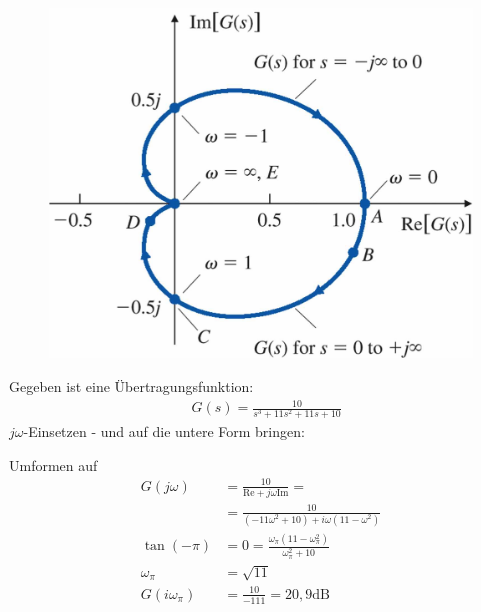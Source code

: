 \begin{tcolorbox}[colback=white!10!white,
                  colframe=blue!50!white,
                  title=Konstruktionsregeln Nyquist-Diagramm]
\begin{figure}[H]
\begin{subfigure}{0.5\linewidth}
    \end{subfigure}
    \begin{minipage}{0.45\linewidth}
        \includegraphics[width=\linewidth]{images/nyquist3}
    \end{minipage}
\end{figure}
\end{tcolorbox}

\begin{tcolorbox}[colback=white!10!white,colframe=red!60!black,title=Berechnung Betragsreserve aus G(s)]
     Gegeben ist eine Übertragungsfunktion:
     \begin{align*}
        &G(s) = \frac{10}{s^3+11s^2+11s+10}
     \end{align*}
     $j\omega$-Einsetzen  - und auf die untere Form bringen:
     
     Umformen auf
     \begin{align*}
         G(j\omega) &= \frac{10}{\text{Re} + j\omega \text{Im}} = \\
         &=\frac{10}{(-11\omega^2+10)+i\omega (11-\omega^2)}\\
         \tan(-\pi) &= 0 = \frac{\omega_{\pi}(11-\omega_{\pi}^2)}{ \omega_{\pi}^2 +10}\\
     \omega_{\pi} &= \sqrt{11}\\
     G(i\omega_{\pi}) &= \frac{10}{-111}  = 20,9 \text{dB}
     \end{align*}
\end{tcolorbox}
